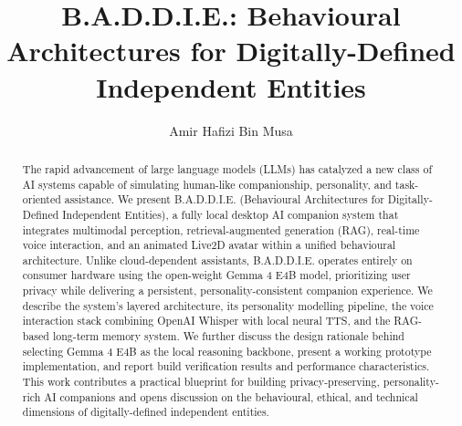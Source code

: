 \documentclass[sigconf]{acmart}
\begin{document}
\title{B.A.D.D.I.E.: Behavioural Architectures for Digitally-Defined Independent Entities}

\author{Amir Hafizi Bin Musa}

\begin{abstract}
The rapid advancement of large language models (LLMs) has catalyzed a new class of AI systems capable of simulating human-like companionship, personality, and task-oriented assistance. We present B.A.D.D.I.E. (Behavioural Architectures for Digitally-Defined Independent Entities), a fully local desktop AI companion system that integrates multimodal perception, retrieval-augmented generation (RAG), real-time voice interaction, and an animated Live2D avatar within a unified behavioural architecture. Unlike cloud-dependent assistants, B.A.D.D.I.E. operates entirely on consumer hardware using the open-weight Gemma 4 E4B model, prioritizing user privacy while delivering a persistent, personality-consistent companion experience. We describe the system's layered architecture, its personality modelling pipeline, the voice interaction stack combining OpenAI Whisper with local neural TTS, and the RAG-based long-term memory system. We further discuss the design rationale behind selecting Gemma 4 E4B as the local reasoning backbone, present a working prototype implementation, and report build verification results and performance characteristics. This work contributes a practical blueprint for building privacy-preserving, personality-rich AI companions and opens discussion on the behavioural, ethical, and technical dimensions of digitally-defined independent entities.
\end{abstract}



\maketitle
\end{document}
